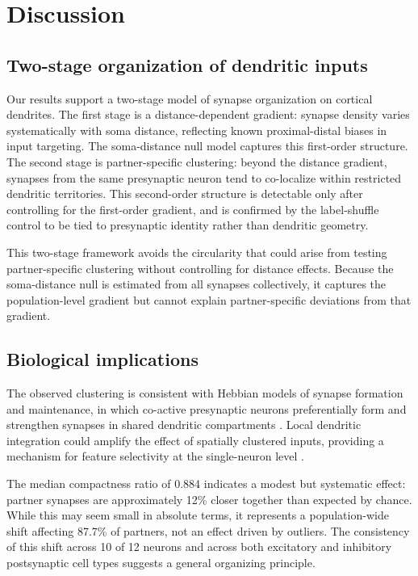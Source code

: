 \section{Discussion}

\subsection{Two-stage organization of dendritic inputs}

Our results support a two-stage model of synapse organization on cortical dendrites. The first stage is a distance-dependent gradient: synapse density varies systematically with soma distance, reflecting known proximal-distal biases in input targeting. The soma-distance null model captures this first-order structure. The second stage is partner-specific clustering: beyond the distance gradient, synapses from the same presynaptic neuron tend to co-localize within restricted dendritic territories. This second-order structure is detectable only after controlling for the first-order gradient, and is confirmed by the label-shuffle control to be tied to presynaptic identity rather than dendritic geometry.

This two-stage framework avoids the circularity that could arise from testing partner-specific clustering without controlling for distance effects. Because the soma-distance null is estimated from all synapses collectively, it captures the population-level gradient but cannot explain partner-specific deviations from that gradient.

\subsection{Biological implications}

The observed clustering is consistent with Hebbian models of synapse formation and maintenance, in which co-active presynaptic neurons preferentially form and strengthen synapses in shared dendritic compartments \citep{larkum2022,poirazi2003}. Local dendritic integration could amplify the effect of spatially clustered inputs, providing a mechanism for feature selectivity at the single-neuron level \citep{branco2010}.

The median compactness ratio of 0.884 indicates a modest but systematic effect: partner synapses are approximately 12\% closer together than expected by chance. While this may seem small in absolute terms, it represents a population-wide shift affecting 87.7\% of partners, not an effect driven by outliers. The consistency of this shift across 10 of 12 neurons and across both excitatory and inhibitory postsynaptic cell types suggests a general organizing principle.

